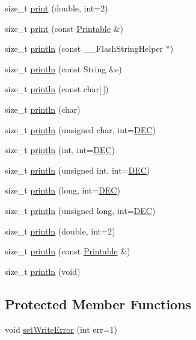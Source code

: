 \begin{DoxyCompactItemize}
\item 
size\-\_\-t \hyperlink{class_print_ae8b4c025786c820afe0a90aeea01c9c5}{print} (double, int=2)
\item 
size\-\_\-t \hyperlink{class_print_a901b0f06ae34aab31b8fbb4298f0596e}{print} (const \hyperlink{class_printable}{Printable} \&)
\item 
size\-\_\-t \hyperlink{class_print_a4fd286b325d3b1a786cfa35072a8ef52}{println} (const \-\_\-\-\_\-\-Flash\-String\-Helper $\ast$)
\item 
size\-\_\-t \hyperlink{class_print_afd6cc6e2c1163f94c60855ad233899bd}{println} (const String \&s)
\item 
size\-\_\-t \hyperlink{class_print_ad337ce3f7977411b7d34d47a51e5737e}{println} (const char\mbox{[}$\,$\mbox{]})
\item 
size\-\_\-t \hyperlink{class_print_a554896a71162f967b5794401239d7a01}{println} (char)
\item 
size\-\_\-t \hyperlink{class_print_ac9afe80f50f0118d735295aec7727e50}{println} (unsigned char, int=\hyperlink{_print_8h_afe38ec6126e35e40049e27fdf4586ba5}{D\-E\-C})
\item 
size\-\_\-t \hyperlink{class_print_a738c88471cfb8eac7c8a804699971413}{println} (int, int=\hyperlink{_print_8h_afe38ec6126e35e40049e27fdf4586ba5}{D\-E\-C})
\item 
size\-\_\-t \hyperlink{class_print_ac87eed1fcb78641169ba2244278c899e}{println} (unsigned int, int=\hyperlink{_print_8h_afe38ec6126e35e40049e27fdf4586ba5}{D\-E\-C})
\item 
size\-\_\-t \hyperlink{class_print_a833fbec3ceba92e3ec95f51e026e4569}{println} (long, int=\hyperlink{_print_8h_afe38ec6126e35e40049e27fdf4586ba5}{D\-E\-C})
\item 
size\-\_\-t \hyperlink{class_print_aebee3c33ee5d8f10b6f378d5273742d0}{println} (unsigned long, int=\hyperlink{_print_8h_afe38ec6126e35e40049e27fdf4586ba5}{D\-E\-C})
\item 
size\-\_\-t \hyperlink{class_print_a56e976b079361b6021ef7c2bedb397a2}{println} (double, int=2)
\item 
size\-\_\-t \hyperlink{class_print_a20f9e104153b62e720c9b4c348b44f00}{println} (const \hyperlink{class_printable}{Printable} \&)
\item 
size\-\_\-t \hyperlink{class_print_a169b128f9e22f0c15883768f580541a2}{println} (void)
\end{DoxyCompactItemize}
\subsection*{Protected Member Functions}
\begin{DoxyCompactItemize}
\item 
void \hyperlink{class_print_a46656410e23c0ec14d7a01b38b3b6f00}{set\-Write\-Error} (int err=1)
\end{DoxyCompactItemize}



